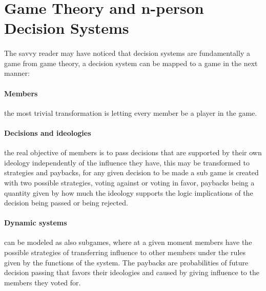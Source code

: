 %
%
\section{Game Theory and n-person Decision Systems}\label{game theory and n-person decision systems}

\paragraph{} The savvy reader may have noticed that decision systems are fundamentally a game from game theory, a decision system can be mapped to a game in the next manner:

\paragraph{Members} the most trivial transformation is letting every member be a player in the game.

\paragraph{Decisions and ideologies} the real objective of members is to pass decisions that are supported by their own ideology independently of the influence they have, this may be transformed to strategies and paybacks, for any given decision to be made a sub game is created with two possible strategies, voting against or voting in favor, paybacks being a quantity given by how much the ideology supports the logic implications of the decision being passed or being rejected.

\paragraph{Dynamic systems} can be modeled as also subgames, where at a given moment members have the possible strategies of transferring influence to other members under the rules given by the functions of the system. The paybacks are probabilities of future decision passing that favors their ideologies and caused by giving influence to the members they voted for.